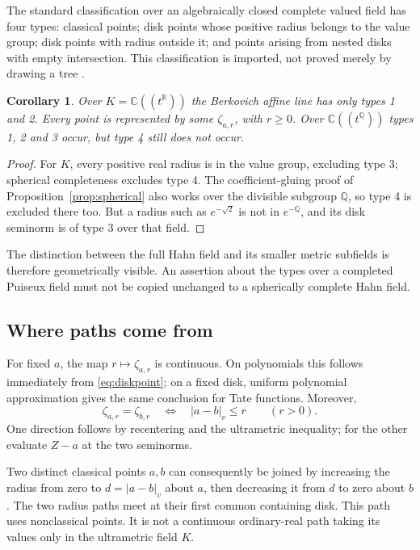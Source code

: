 \documentclass[11pt,a4paper]{article}
\numberwithin{equation}{section}
\newtheorem{corollary}[theorem]{Corollary}
\theoremstyle{definition}
\theoremstyle{remark}
\newcommand{\C}{\mathbb C}
\newcommand{\R}{\mathbb R}
\newcommand{\Q}{\mathbb Q}
\newcommand{\vabs}[1]{\lvert#1\rvert_v}
\begin{document}
The standard classification over an algebraically closed complete valued field
has four types: classical points; disk points whose positive radius belongs to
the value group; disk points with radius outside it; and points arising from
nested disks with empty intersection. This classification is imported, not
proved merely by drawing a tree
\cite[Lemma I.2.11, Proposition I.2.12 and Remark I.2.13]{PT}.

\begin{corollary}\label{cor:types}
Over $K=\C((t^\R))$ the Berkovich affine line has only types 1 and 2.
Every point is represented by some $\zeta_{a,r}$, with $r\ge0$.
Over $\C((t^\Q))$ types 1, 2 and 3 occur, but type 4 still does not occur.
\end{corollary}
\begin{proof}
For $K$, every positive real radius is in the value group, excluding type 3;
spherical completeness excludes type 4. The coefficient-gluing proof of
Proposition~\ref{prop:spherical} also works over the divisible subgroup $\Q$,
so type 4 is excluded there too. But a radius such as $e^{-\sqrt2}$ is not in
$e^{-\Q}$, and its disk seminorm is of type 3 over that field.
\end{proof}

The distinction between the full Hahn field and its smaller metric subfields
is therefore geometrically visible. An assertion about the types over a
completed Puiseux field must not be copied unchanged to a spherically complete
Hahn field.

\subsection{Where paths come from}
For fixed $a$, the map $r\mapsto\zeta_{a,r}$ is continuous. On polynomials this
follows immediately from \eqref{eq:diskpoint}; on a fixed disk, uniform
polynomial approximation gives the same conclusion for Tate functions.
Moreover,
\begin{equation}\label{eq:equaldisk}
 \zeta_{a,r}=\zeta_{b,r}
 \quad\Longleftrightarrow\quad \vabs{a-b}\le r
 \qquad(r>0).
\end{equation}
One direction follows by recentering and the ultrametric inequality; for the
other evaluate $Z-a$ at the two seminorms.

Two distinct classical points $a,b$ can consequently be joined by increasing
the radius from zero to $d=\vabs{a-b}$ about $a$, then decreasing it from $d$
to zero about $b$. The two radius paths meet at their first common containing
disk. This path uses nonclassical points. It is not a continuous ordinary-real
path taking its values only in the ultrametric field $K$.
\end{document}
